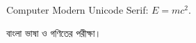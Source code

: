 \documentclass{article}
\begin{document}
Computer Modern Unicode Serif: $E=mc^2$.

{\bengali বাংলা ভাষা ও গণিতের পরীক্ষা।}
\end{document}
